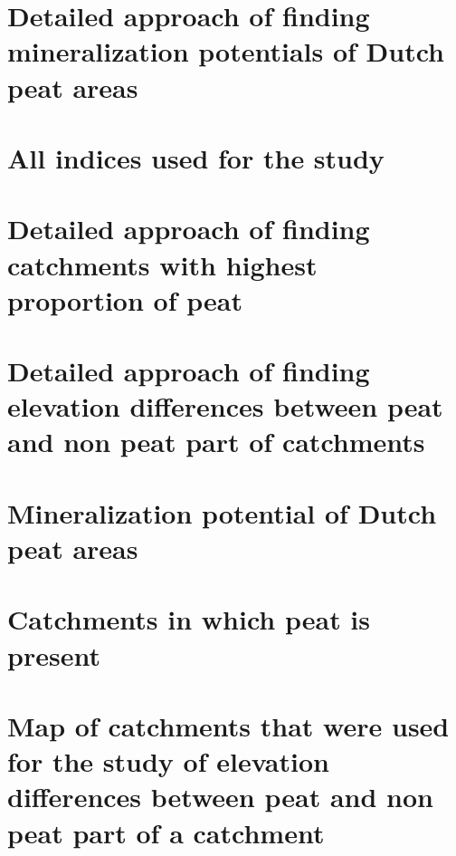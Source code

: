 \documentclass[a4paper,12pt]{scrbook}
\begin{document}
\begin{appendices}
\chapter{Detailed approach of finding mineralization potentials of Dutch peat areas}
\label{ann:peatmineralpot}

\chapter{All indices used for the study}
\label{ann:indicesused}

\chapter{Detailed approach of finding catchments with highest proportion of peat}
\label{ann:workflowwholecatch}

\chapter{Detailed approach of finding elevation differences between peat and non peat part of catchments}
\label{ann:workflowpartcatch}

\chapter{Mineralization potential of Dutch peat areas}
\label{ann:mineralmap}

\chapter{Catchments in which peat is present}
\label{ann:catchwithpea}

\chapter{Map of catchments that were used for the study of elevation differences between peat and non peat part of a catchment}
\label{ann:partcatchmap}

\end{appendices}


\end{document}
